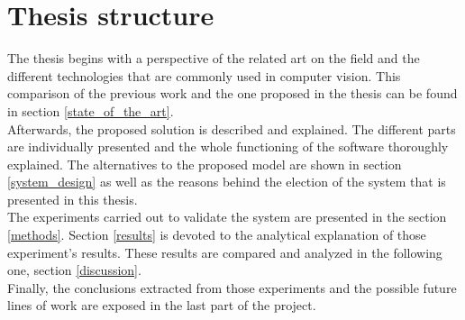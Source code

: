 \section{Thesis structure}

The thesis begins with a perspective of the related art on the field and the different technologies that are commonly used in computer vision. This comparison of the previous work and the one proposed in the thesis can be found in section \ref{state_of_the_art}. 
\\

Afterwards, the proposed solution is described and explained. The different parts are individually presented and the whole functioning of the software thoroughly explained. The alternatives to the proposed model are shown in section \ref{system_design} as well as the reasons behind the election of the system that is presented in this thesis. 
\\

The experiments carried out to validate the system are presented in the section \ref{methods}. Section \ref{results} is devoted to the analytical explanation of those experiment's results. 
These results are compared and analyzed in the following one, section \ref{discussion}. 
\\

Finally, the conclusions extracted from those experiments and the possible future lines of work are exposed in the last part of the project. 
